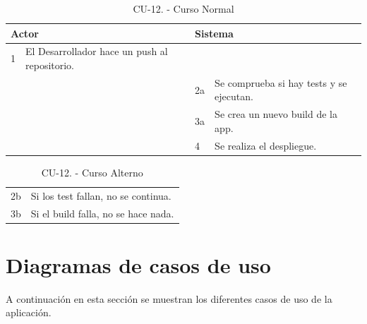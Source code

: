 \begin{itemize}
\begin{itemize}
\begin{table}[H]
\begin{tabularx}{\textwidth}{|l|X|l|X|}
      \multicolumn{2}{|l|}{\cellcolor[HTML]{EFEFEF}Actor} & \multicolumn{2}{l|}{\cellcolor[HTML]{EFEFEF}Sistema} \\ \hline
      1                         & El Desarrollador hace un push al repositorio.                        &                            &                         \\ \hline
                                &                         & 2a                          & Se comprueba si hay tests  y se ejecutan.                       \\ \hline
                                &                         & 3a                           & Se crea un nuevo build de la app.                       \\ \hline
                                &                         & 4                           & Se realiza el despliegue.                       \\ \hline

                                
    \end{tabularx}
    \caption{CU-12. - Curso Normal}
    \label{table-20}
  \end{table}
  \begin{table}[H]
    \centering
    \begin{tabularx}{\textwidth}{|l|X|}
     \hline
     \rowcolor[HTML]{C0C0C0} 
     \multicolumn{2}{|l|}{\cellcolor[HTML]{C0C0C0}Curso Alterno} \\ \hline
     \rowcolor[HTML]{FFFFFF} 
            2b                      & Si los test fallan, no se continua.                           \\ \hline
            3b                      & Si el build falla, no se hace nada.                           \\ \hline
    \end{tabularx}
    \caption{CU-12. - Curso Alterno}
    \label{table-21}
  \end{table}
\end{itemize}
\end{itemize}

\section {Diagramas de casos de uso}
A continuación en esta sección se muestran los diferentes casos de uso de la aplicación.

